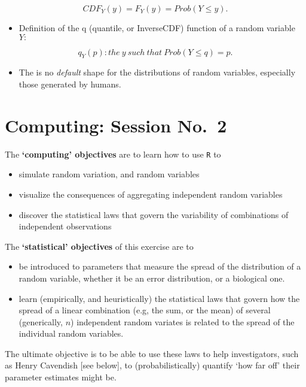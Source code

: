 \documentclass[]{book}
\providecommand{\tightlist}{%
  \setlength{\itemsep}{0pt}\setlength{\parskip}{0pt}}
\begin{document}
\[CDF_Y(y) = F_Y(y) =  Prob( Y \le y).\]

\begin{itemize}
\tightlist
\item
  Definition of the q (quantile, or InverseCDF) function of a random variable \(Y:\)
\end{itemize}

\[ q_Y(p) : the \ y \ such \ that \ Prob( Y \le q) = p.\]

\begin{itemize}
\tightlist
\item
  The is no \emph{default} shape for the distributions of random variables, especially those generated by humans.
\end{itemize}

\hypertarget{computing02}{%
\chapter{Computing: Session No.~2}\label{computing02}}

The \textbf{`computing' objectives} are to learn how to use \texttt{R} to

\begin{itemize}
\item
  simulate random variation, and random variables
\item
  visualize the consequences of aggregating independent random variables\\
\item
  discover the statistical laws that govern the variability of combinations of independent observations
\end{itemize}

The \textbf{`statistical' objectives} of this exercise are to

\begin{itemize}
\item
  be introduced to parameters that measure the spread of the distribution of a random variable, whether it be an error distribution, or a biological one.
\item
  learn (empirically, and heuristically) the statistical laws that govern how the spread of a linear combination (e.g, the sum, or the mean) of several (generically, \(n\)) independent random variates is related to the spread of the individual random variables.
\end{itemize}

The ultimate objective is to be able to use these laws to help investigators, such as Henry Cavendish {[}see below{]}, to (probabilistically) quantify `how far off' their parameter estimates might be.
\end{document}
